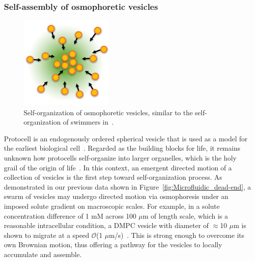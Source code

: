 \documentclass[11pt]{article}
\begin{document}
\subsubsection{Self-assembly of osmophoretic vesicles \label{subsubsec:self-assembly}}
\begin{figure}
\vspace*{-15pt}
\centerline{\includegraphics[width=1.8in]{figs/self-organization.pdf}}
\vspace*{-15pt}
\caption{\label{fig:self-organization} \footnotesize Self-organization
  of osmophoretic vesicles, similar to the self-organization of swimmers
  in~\cite{Nikolov2016_COCIS}.}
\end{figure}
%
Protocell is an endogenously ordered spherical vesicle that is used as a
model for the earliest biological cell~\cite{chen2010}.  Regarded as the
building blocks for life, it remains unknown how protocells
self-organize into larger organelles, which is the holy grail of the
origin of life~\cite{shklyaev2016}. In this context, an emergent
directed motion of a collection of vesicles is the first step toward
self-organization process.  As demonstrated in our previous data shown
in Figure~\ref{fig:Microfluidic_dead-end}, a swarm of vesicles may
undergo directed motion via osmophoresis under an imposed solute
gradient on macroscopic scales.  For example, in a solute concentration
difference of 1 mM across 100 $\mu$m of length scale, which is a
reasonable intracellular condition, a DMPC vesicle with diameter of
$\approx$10 $\mu$m is shown to migrate at a speed $\mathcal{O}$(1
$\mu$m/s)~\cite{nardi1999}. This is strong enough to overcome its own
Brownian motion, thus offering a pathway for the vesicles to locally
accumulate and assemble.
\end{document}
